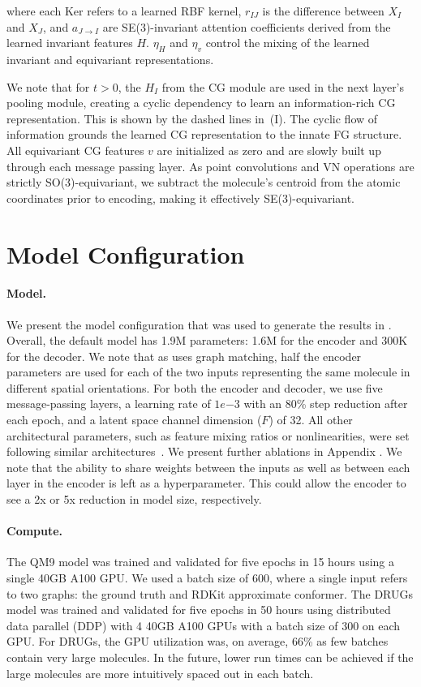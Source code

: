 where each Ker refers to a learned RBF kernel, $r_{IJ}$ is the difference between $X_I$ and $X_J$, and $a_{J\to I}$ are SE(3)-invariant attention coefficients derived from the learned invariant features $H$. $\eta_H$ and $\eta_v$ control the mixing of the learned invariant and equivariant representations.

We note that for $t > 0$, the $H_I$ from the CG module are used in the next layer's pooling module, creating a cyclic dependency to learn an information-rich CG representation. This is shown by the dashed lines in~(I). The cyclic flow of information grounds the learned CG representation to the innate FG structure. All equivariant CG features $v$ are initialized as zero and are slowly built up through each message passing layer. As point convolutions and VN operations are strictly SO(3)-equivariant, we subtract the molecule’s centroid from the atomic coordinates prior to encoding, making it effectively SE(3)-equivariant.

\section{Model Configuration}
\label{section:appendix-breakdown}
\vspace{-1ex}
\paragraph{Model.} We present the model configuration that was used to generate the results in .
Overall, the default model has 1.9M parameters: 1.6M for the encoder and 300K for the decoder. We note that as \model uses graph matching, half the encoder parameters are used for each of the two inputs representing the same molecule in different spatial orientations. For both the encoder and decoder, we use five message-passing layers, a learning rate of $1e{-3}$ with an 80\% step reduction after each epoch, and a latent space channel dimension ($F$) of 32. All other architectural parameters, such as feature mixing ratios or nonlinearities, were set following similar architectures~\citep{3dlinker, vn-mlp, equibind}. We present further ablations in Appendix . We note that the ability to share weights between the inputs as well as between each layer in the encoder is left as a hyperparameter. This could allow the encoder to see a 2x or 5x reduction in model size, respectively.

\paragraph{Compute.}
The QM9 model was trained and validated for five epochs in 15 hours using a single 40GB A100 GPU. We used a batch size of 600, where a single input refers to two graphs: the ground truth and RDKit approximate conformer. The DRUGs model was trained and validated for five epochs in 50 hours using distributed data parallel (DDP) with 4 40GB A100 GPUs with a batch size of 300 on each GPU. For DRUGs, the GPU utilization was, on average, 66\% as few batches contain very large molecules. In the future, lower run times can be achieved if the large molecules are more intuitively spaced out in each batch. 

